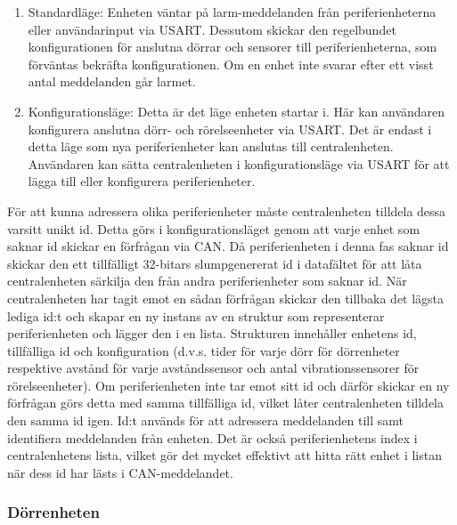\documentclass{article}
\begin{document}
\begin{enumerate}
    \item Standardläge: Enheten väntar på larm-meddelanden från periferienheterna eller användarinput via USART. Dessutom skickar den regelbundet konfigurationen för anslutna dörrar och sensorer till periferienheterna, som förväntas bekräfta konfigurationen.
    Om en enhet inte svarar efter ett visst antal meddelanden går larmet.
    \item Konfigurationsläge: Detta är det läge enheten startar i.
    Här kan användaren konfigurera anslutna dörr- och rörelseenheter via USART. Det är endast i detta läge som nya periferienheter kan anslutas till centralenheten. Användaren kan sätta centralenheten i konfigurationsläge via USART för att lägga till eller konfigurera periferienheter.
\end{enumerate}

För att kunna adressera olika periferienheter måste centralenheten tilldela dessa varsitt unikt id.
Detta görs i konfigurationsläget genom att varje enhet som saknar id skickar en förfrågan via CAN. Då periferienheten i denna fas saknar id skickar den ett tillfälligt 32-bitars slumpgenererat id i datafältet för att låta centralenheten särkilja den från andra periferienheter som saknar id.
När centralenheten har tagit emot en sådan förfrågan skickar den tillbaka det lägsta lediga id:t och skapar en ny instans av en struktur som representerar periferienheten och lägger den i en lista. Strukturen innehåller enhetens id, tillfälliga id och konfiguration (d.v.s. tider för varje dörr för dörrenheter respektive avstånd för varje avståndssensor och antal vibrationssensorer för rörelseenheter). Om periferienheten inte tar emot sitt id och därför skickar en ny förfrågan görs detta med samma tillfälliga id, vilket låter centralenheten tilldela den samma id igen.
Id:t används för att adressera meddelanden till samt identifiera meddelanden från enheten. Det är också periferienhetens index i centralenhetens lista, vilket gör det mycket effektivt att hitta rätt enhet i listan när dess id har lästs i CAN-meddelandet.





\subsubsection{Dörrenheten}
\label{subsec:Dörrenheten}
\end{document}
